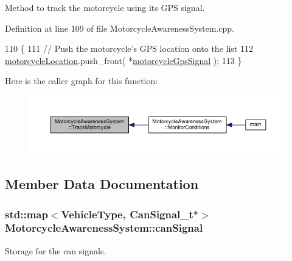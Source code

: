 Method to track the motorcycle using its G\-P\-S signal. 



Definition at line 109 of file Motorcycle\-Awareness\-System.\-cpp.


\begin{DoxyCode}
110 \{
111     \textcolor{comment}{// Push the motorcycle's GPS location onto the list}
112     \hyperlink{classMotorcycleAwarenessSystem_af6becfeb1d11b467cb80a94a8e6940ac}{motorcycleLocation}.push\_front( *\hyperlink{classMotorcycleAwarenessSystem_ab281a3993b574923b2f379ed0477b2d4}{motorcycleGpsSignal} );
113 \}
\end{DoxyCode}


Here is the caller graph for this function\-:\nopagebreak
\begin{figure}[H]
\begin{center}
\leavevmode
\includegraphics[width=350pt]{classMotorcycleAwarenessSystem_a4e6eec23ec46e24ee377a3c94e15eba4_icgraph}
\end{center}
\end{figure}




\subsection{Member Data Documentation}
\hypertarget{classMotorcycleAwarenessSystem_a2d8ac602ae24dcf38aaa95a42ffb4e1f}{
\subsubsection[{can\-Signal}]{\setlength{\rightskip}{0pt plus 5cm}std\-::map$<${\bf Vehicle\-Type}, {\bf Can\-Signal\-\_\-t}$\ast$$>$ Motorcycle\-Awareness\-System\-::can\-Signal\hspace{0.3cm}{\ttfamily [private]}}}\label{classMotorcycleAwarenessSystem_a2d8ac602ae24dcf38aaa95a42ffb4e1f}


Storage for the can signals. 



